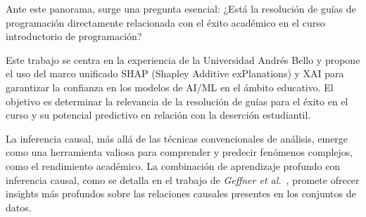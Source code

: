 Ante este panorama, surge una pregunta esencial: ¿Está la resolución de guías de programación directamente relacionada con el éxito académico en el curso introductorio de programación?

Este trabajo se centra en la experiencia de la Universidad Andrés Bello y propone el uso del marco unificado SHAP (Shapley Additive exPlanations) y XAI para garantizar la confianza en los modelos de AI/ML en el ámbito educativo. El objetivo es determinar la relevancia de la resolución de guías para el éxito en el curso y su potencial predictivo en relación con la deserción estudiantil.

La inferencia causal, más allá de las técnicas convencionales de análisis, emerge como una herramienta valiosa para comprender y predecir fenómenos complejos, como el rendimiento académico. La combinación de aprendizaje profundo con inferencia causal, como se detalla en el trabajo de \textit{Geffner et al.}~\cite{geffner2022deep}, promete ofrecer insights más profundos sobre las relaciones causales presentes en los conjuntos de datos.
